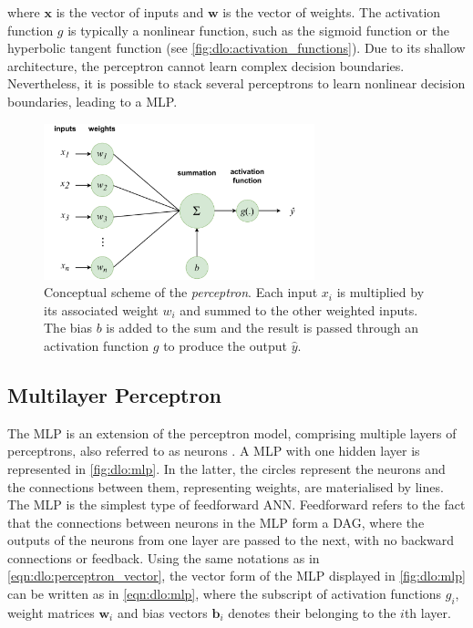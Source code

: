 \noindent where $\mathbf{x}$ is the vector of inputs and $\mathbf{w}$ is the
vector of weights. The activation function $g$ is typically a nonlinear
function, such as the sigmoid function or the hyperbolic tangent function (see
\cref{fig:dlo:activation_functions}). Due to its shallow architecture, the
perceptron cannot learn complex decision boundaries. Nevertheless, it is
possible to stack several perceptrons to learn nonlinear decision boundaries,
leading to a \acl{MLP}.\\

\begin{figure}[htbp]
  \centering
  \includegraphics[width=0.7\textwidth]{chapter_dlo/assets/perceptron_scheme.pdf}
  \caption{Conceptual scheme of the \emph{perceptron}. Each input $x_i$ is multiplied
  by its associated weight $w_i$ and summed to the other weighted inputs. The
  bias $b$ is added to the sum and the result is passed through an activation
  function $g$ to produce the output $\hat{y}$.}
  \label{fig:dlo:perceptron}
\end{figure}

\subsection{Multilayer Perceptron}\label{sec:dlo:mlp}

The \acf{MLP} is an extension of the perceptron model, comprising multiple
layers of perceptrons, also referred to as neurons \cite{rumelhart1986learning}.
A \ac{MLP} with one hidden layer is represented in \cref{fig:dlo:mlp}. In the
latter, the circles represent the neurons and the connections between them,
representing weights, are materialised by lines. The \ac{MLP} is the simplest
type of feedforward \ac{ANN}. Feedforward refers to the fact that the
connections between neurons in the \ac{MLP} form a \acf{DAG}, where the outputs
of the neurons from one layer are passed to the next, with no backward
connections or feedback. Using the same notations as in
\cref{eqn:dlo:perceptron_vector}, the vector form of the \ac{MLP} displayed in
\cref{fig:dlo:mlp} can be written as in \cref{eqn:dlo:mlp}, where the subscript
of activation functions $g_i$, weight matrices $\mathbf{w}_i$ and bias vectors
$\mathbf{b}_i$ denotes their belonging to the $i$th layer.\\

